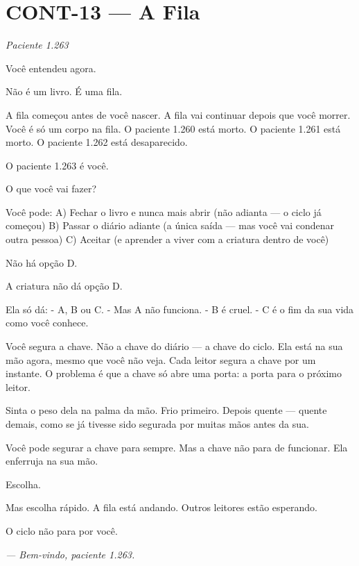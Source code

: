 \section*{\textbf{CONT-13} --- A Fila}

\noindent \textit{Paciente 1.263}

\noindent Você entendeu agora.

\noindent Não é um livro.
É uma fila.

\noindent A fila começou antes de você nascer.
A fila vai continuar depois que você morrer.
Você é só um corpo na fila.
O paciente 1.260 está morto.
O paciente 1.261 está morto.
O paciente 1.262 está desaparecido.

\noindent O paciente 1.263 é você.

\noindent O que você vai fazer?

\noindent Você pode:
A) Fechar o livro e nunca mais abrir (não adianta --- o ciclo já começou)
B) Passar o diário adiante (a única saída --- mas você vai condenar outra pessoa)
C) Aceitar (e aprender a viver com a criatura dentro de você)

\noindent Não há opção D.

\noindent A criatura não dá opção D.

\noindent Ela só dá:
- A, B ou C.
- Mas A não funciona.
- B é cruel.
- C é o fim da sua vida como você conhece.

\noindent Você segura a chave. Não a chave do diário --- a chave do ciclo. Ela está na sua mão agora, mesmo que você não veja. Cada leitor segura a chave por um instante. O problema é que a chave só abre uma porta: a porta para o próximo leitor.

\noindent Sinta o peso dela na palma da mão. Frio primeiro. Depois quente --- quente demais, como se já tivesse sido segurada por muitas mãos antes da sua.

\noindent Você pode segurar a chave para sempre. Mas a chave não para de funcionar. Ela enferruja na sua mão.

\noindent Escolha.

\noindent Mas escolha rápido.
A fila está andando.
Outros leitores estão esperando.

\noindent O ciclo não para por você.

\noindent \textit{--- Bem-vindo, paciente 1.263.}

